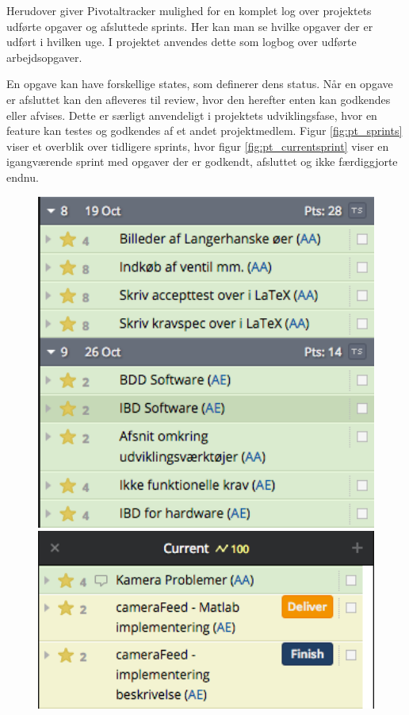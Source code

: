Herudover giver Pivotaltracker mulighed for en komplet log over projektets udførte opgaver og afsluttede sprints. Her kan man se hvilke opgaver der er udført i hvilken uge. I projektet anvendes dette som logbog over udførte arbejdsopgaver.

En opgave kan have forskellige states, som definerer dens status. Når en opgave er afsluttet kan den afleveres til review, hvor den herefter enten kan godkendes eller afvises. Dette er særligt anvendeligt i projektets udviklingsfase, hvor en feature kan testes og godkendes af et andet projektmedlem. Figur \ref{fig:pt_sprints}  viser et overblik over tidligere sprints, hvor figur \ref{fig:pt_currentsprint} viser en igangværende sprint med opgaver der er godkendt, afsluttet og ikke færdiggjorte endnu.

\begin{figure}[htbp] \centering
\begin{minipage}[b]{0.48\textwidth} \centering
\includegraphics[width=1.00\textwidth]{billeder/pt_previous_sprints} %
\end{minipage} \hfill
\begin{minipage}[b]{0.48\textwidth} \centering
\includegraphics[width=1.00\textwidth]{billeder/pt_current_sprint} %

\end{minipage}
\end{figure}
